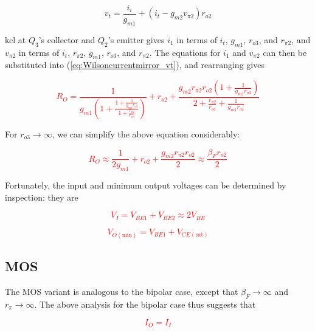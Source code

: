 \begin{equation}
v_{t} = \frac{i_{i}}{g_{m1}} + (i_{t} - g_{m2}v_{\pi2})r_{o2}
\label{eq:Wilsoncurrentmirror_vt}
\end{equation}

\ac{kcl} at $Q_3$'s collector and $Q_2$'s emitter gives $i_{1}$ in terms of $i_{t}$, $g_{m1}$, $r_{o3}$, and $r_{\pi2}$, and $v_{\pi2}$ in terms of $i_{t}$, $r_{\pi2}$, $g_{m1}$, $r_{o3}$, and $r_{\pi2}$.
The equations for $i_{1}$ and $v_{\pi2}$ can then be substituted into (\ref{eq:Wilsoncurrentmirror_vt}), and rearranging gives \autocite[274-277]{analysis-design-analog-ics}

\textcolor{red}{
\begin{equation}
R_{O} = \frac{1}{g_{m1}\left(1 + \frac{1+\frac{1}{g_{m1}r_{o3}}}{1+\frac{r_{\pi2}}{r_{o3}}}\right)} + r_{o2} + \frac{g_{m2}r_{\pi2}r_{o2}\left(1+\frac{1}{g_{m1}r_{o3}}\right)}{2 + \frac{r_{\pi2}}{r_{o3}} + \frac{1}{g_{m1}r_{o3}}}
\end{equation}
}

For $r_{o3} \to \infty$, we can simplify the above equation considerably:

\textcolor{red}{
\begin{equation}
R_{O} \approx \frac{1}{2g_{m1}} + r_{o2} + \frac{g_{m2}r_{\pi2}r_{o2}}{2} \approx \frac{\beta_{F} r_{o2}}{2}
\end{equation}
}

Fortunately, the input and minimum output voltages can be determined by inspection: they are

\textcolor{red}{
\begin{equation}
V_{I}= V_{BE1} + V_{BE2} \approx 2V_{BE}
\end{equation}
}

\textcolor{red}{
\begin{equation}
V_{O(\text{min})} = V_{BE1} + V_{CE(\text{sat})}
\end{equation}
}

\subsection{MOS}
The MOS variant is analogous to the bipolar case, except that $\beta_{F} \to \infty$ and $r_{\pi} \to \infty$.
The above analysis for the bipolar case thus suggests that

\textcolor{red}{
\begin{equation}
I_{O} = I_{I}
\end{equation}
}

